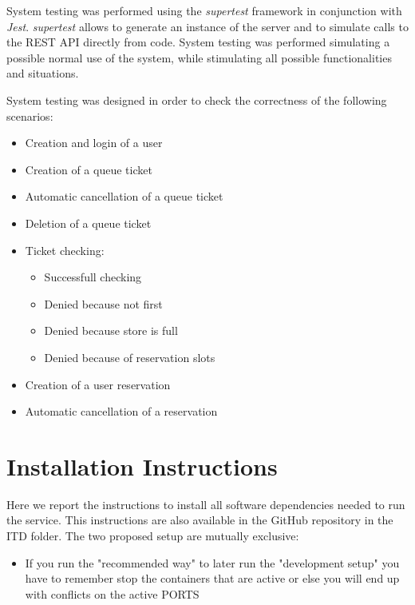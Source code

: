\documentclass[
]{article}
\begin{document}
System testing was performed using the \emph{supertest} framework in conjunction with \emph{Jest}. \emph{supertest} allows to generate an instance of the server and to simulate calls to the REST API directly from code. System testing was performed simulating a possible normal use of the system, while stimulating all possible functionalities and situations.

System testing was designed in order to check the correctness of the following scenarios:
\begin{itemize}
  \item Creation and login of a user
  \item Creation of a queue ticket
  \item Automatic cancellation of a queue ticket
  \item Deletion of a queue ticket
  \item Ticket checking:
  \begin{itemize}
    \item Successfull checking
    \item Denied because not first
    \item Denied because store is full
    \item Denied because of reservation slots
  \end{itemize}
  \item Creation of a user reservation
  \item Automatic cancellation of a reservation
\end{itemize}

\hypertarget{installation-instructions}{%
\section{Installation Instructions}\label{installation-instructions}}

Here we report the instructions to install all software dependencies
needed to run the service. This instructions are also available in the
GitHub repository in the ITD folder.
The two proposed setup are mutually exclusive: 
\begin{itemize}
  \item If you run the "recommended way" to later run the "development setup" you have to remember stop the containers that are active or else you will end up with conflicts on the active PORTS
\end{itemize}
\end{document}
